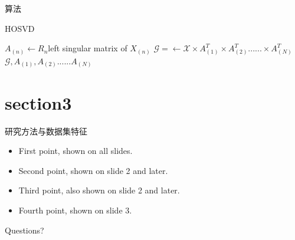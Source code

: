 \documentclass[10pt]{beamer}
\begin{document}
\begin{frame}{算法}
  \begin{algorithm}[H]
    \caption{HOSVD}
    \small 
    
    {
      $A_{(n)}\leftarrow R_{n}$left singular matrix of $X_{(n)}$
    }
    $\mathcal{G}=\leftarrow \mathcal{X} \times A_{(1)}^{T} \times A_{(2)}^{T}...... \times A_{(N)}^{T}$\\
    \Return $\mathcal{G},A_{(1)},A_{(2)}......A_{(N)} $
  \end{algorithm}
  \end{frame}

\section{section3}
\begin{frame}{研究方法与数据集特征}
  \begin{itemize}
    \item<1-> First point, shown on all slides.
    \item<2-> Second point, shown on slide 2 and later.
    \item<3-> Third point, also shown on slide 2 and later.
    \item<4-> Fourth point, shown on slide 3.
  \end{itemize}
\end{frame}

\begin{frame}
  \hspace{3cm}
  \Huge{Questions?}
\end{frame}
\end{document}
